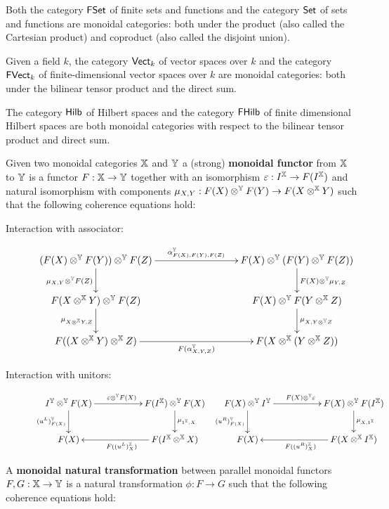\begin{example}
Both the category $\mathsf{FSet}$ of finite sets and functions and the category $\mathsf{Set}$ of sets and functions are monoidal categories: both under the product (also called the Cartesian product) and coproduct (also called the disjoint union).

Given a field $k$, the category $\mathsf{Vect}_k$ of vector spaces over $k$  and the category $\mathsf{FVect}_k$ of finite-dimensional vector spaces over $k$ are monoidal categories:  both under the bilinear tensor product and the direct sum.

The category $\mathsf{Hilb}$ of Hilbert spaces and the category $\mathsf{FHilb}$ of finite dimensional Hilbert spaces are both monoidal categories with respect to the bilinear tensor product and direct sum.
\end{example}
\begin{definition}
Given two monoidal categories $\mathbb{X}$ and $\mathbb{Y}$ a (strong) {\bf monoidal functor} from $\mathbb{X}$ to $\mathbb{Y}$ is a functor $F:\mathbb{X}\to \mathbb{Y}$ together with an isomorphism $\varepsilon:I^{\mathbb{X}} \to F(I^{\mathbb{X}})$ and natural isomorphism with components $\mu_{X,Y}:F(X)\otimes^{\mathbb{Y}} F(Y) \to F(X \otimes^{\mathbb{X}} Y)$ such that the following coherence equations hold:
\begin{description}
\item[Interaction with associator:]
$$
\xymatrix{
 (F(X)\otimes^\Y F(Y))\otimes^\Y F(Z) \ar[rrr]^{\alpha_{F(X),F(Y),F(Z)}^{\Y}} \ar[d]_{\mu_{X,Y}\otimes^\Y F(Z)}
   &&& F(X) \otimes^\Y (F(Y)\otimes^\Y F(Z)) \ar[d]^{F(X)\otimes^\Y \mu_{Y,Z}}
 \\F(X\otimes^\X Y)\otimes^\Y F(Z) \ar[d]_{\mu_{X\otimes^\X Y,Z}}
   &&& F(X)\otimes^\Y F(Y\otimes^\X Z) \ar[d]^{\mu_{X,Y\otimes^\Y Z}}
 \\ F((X\otimes^\X Y) \otimes^\X Z) \ar[rrr]_{F(\alpha_{X,Y,Z}^\Y)}
   &&& F(X\otimes^\X (Y\otimes^\X Z))
}
$$
\item[Interaction with unitors:]
$$
\xymatrix{
 I^\Y \otimes^\Y F(X) \ar[rr]^{\epsilon \otimes^\Y F(X)} \ar[d]_{(u^L)^\Y_{F(X)}}
  &&  F(I^\X) \otimes^\Y F(X) \ar[d]^{\mu_{1^\X,X}}
\\F(X)
 & & F(I^\X\otimes^\X X) \ar[ll]^{F((u^L)^\X_{X} )}
} \hspace*{.2cm}
\xymatrix{
  F(X)  \otimes^\Y I^\Y \ar[rr]^{ F(X)  \otimes^\Y \epsilon} \ar[d]_{(u^R)^\Y_{F(X)}}
  && F(X) \otimes^\Y    F(I^\X)  \ar[d]^{\mu_{X,1^\X}}
\\F(X)
 & & F(X \otimes^\X I^\X ) \ar[ll]^{F((u^R)^\X_{X} )}
}
$$
\end{description}
A {\bf monoidal natural transformation} between parallel monoidal functors $F,G:\mathbb{X}\to \mathbb{Y}$ is a natural transformation $\phi:F\to G$ such that the following coherence equations hold:

\end{definition}
